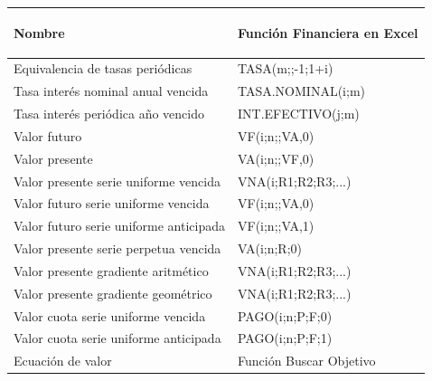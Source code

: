 \begin{center}
\begin{tabular}{ |p{8cm}| p{5cm}|}
\hline 
\rowcolor{orange!50}
\begin{center}\textbf{Nombre} \end{center}  & \begin{center} \textbf{Función Financiera en Excel} \end{center}  \\ \hline

Equivalencia de tasas periódicas &  TASA(m;;-1;1+i)\\\hline 

Tasa interés nominal anual vencida & TASA.NOMINAL(i;m) \\ \hline

Tasa interés periódica año vencido & INT.EFECTIVO(j;m) \\ \hline

Valor futuro & VF(i;n;;VA,0)\\ \hline 

Valor presente & VA(i;n;;VF,0)\\ \hline 

Valor presente serie uniforme vencida & VNA(i;R1;R2;R3;...) \\ \hline  

Valor futuro serie uniforme vencida &  VF(i;n;;VA,0)\\ \hline

Valor futuro serie uniforme anticipada & VF(i;n;;VA,1)\\ \hline 

Valor presente serie perpetua vencida & VA(i;n;R;0) \\ \hline

Valor presente gradiente aritmético & VNA(i;R1;R2;R3;...) \\ \hline

Valor presente gradiente geométrico & VNA(i;R1;R2;R3;...) \\ \hline

Valor cuota serie uniforme vencida & PAGO(i;n;P;F;0) \\ \hline

Valor cuota serie uniforme anticipada & PAGO(i;n;P;F;1) \\ \hline

Ecuación de valor & Función Buscar Objetivo\\ \hline

\end{tabular}
\end{center}


